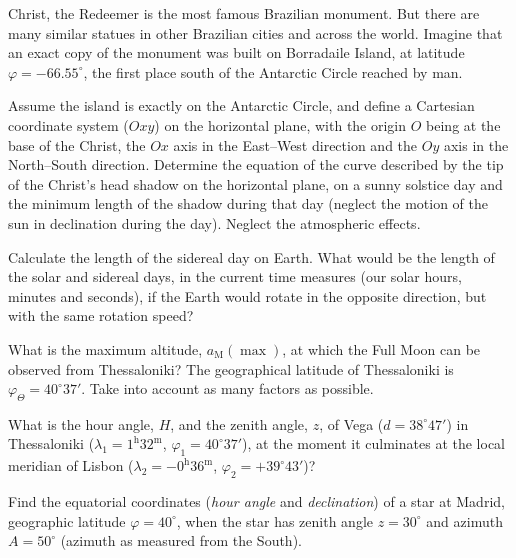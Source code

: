 Christ, the Redeemer is the most famous Brazilian monument. But there are many
similar statues in other Brazilian cities and across the world. Imagine that
an exact copy of the monument was built on Borradaile Island, at latitude
$\varphi = -66.55^\circ$, the first place south of the Antarctic Circle
reached by man.

Assume the island is exactly on the Antarctic Circle, and define a Cartesian
coordinate system ($Oxy$) on the horizontal plane, with the origin $O$ being
at the base of the Christ, the $Ox$ axis in the East--West direction and the
$Oy$ axis in the North--South direction. Determine the equation of the curve
described by the tip of the Christ's head shadow on the horizontal plane, on a
sunny solstice day and the minimum length of the shadow during that day
(neglect the motion of the sun in declination during the day). Neglect the
atmospheric effects.

Calculate the length of the sidereal day on Earth. What would be the length of
the solar and sidereal days, in the current time measures (our solar hours,
minutes and seconds), if the Earth would rotate in the opposite direction, but
with the same rotation speed?

What is the maximum altitude, $a_{\mathrm{M}}(\max)$, at which the Full Moon
can be observed from Thessaloniki? The geographical latitude of Thessaloniki
is $\varphi_\Theta = 40^\circ 37'$. Take into account as many factors as
possible.

What is the hour angle, $H$, and the zenith angle, $z$, of Vega
($d = 38^\circ 47'$) in Thessaloniki
($\lambda_1 = 1^{\mathrm{h}}32^{\mathrm{m}}$,
$\varphi_1 = 40^\circ 37'$), at the moment it culminates at the local meridian
of Lisbon ($\lambda_2 = -0^{\mathrm{h}}36^{\mathrm{m}}$,
$\varphi_2 = +39^\circ 43'$)?

Find the equatorial coordinates (\emph{hour angle} and \emph{declination}) of
a star at Madrid, geographic latitude $\varphi = 40^\circ$, when the star has
zenith angle $z = 30^\circ$ and azimuth $A = 50^\circ$ (azimuth as measured
from the South).

